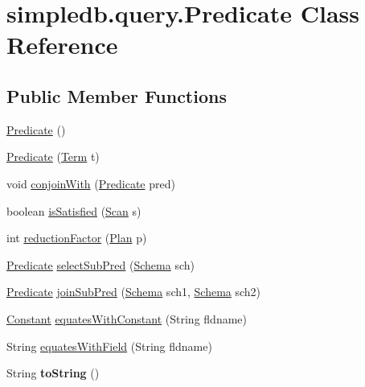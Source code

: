 \hypertarget{classsimpledb_1_1query_1_1Predicate}{}\section{simpledb.\+query.\+Predicate Class Reference}
\label{classsimpledb_1_1query_1_1Predicate}
\subsection*{Public Member Functions}
\begin{DoxyCompactItemize}
\item 
\hyperlink{classsimpledb_1_1query_1_1Predicate_aa52f71d773d6c8577f78868eecc30b5d}{Predicate} ()
\item 
\hyperlink{classsimpledb_1_1query_1_1Predicate_abf1bd6b991bdbf075da1926957458d04}{Predicate} (\hyperlink{classsimpledb_1_1query_1_1Term}{Term} t)
\item 
void \hyperlink{classsimpledb_1_1query_1_1Predicate_a986fd2943734aef4ed929e17d7d65e59}{conjoin\+With} (\hyperlink{classsimpledb_1_1query_1_1Predicate}{Predicate} pred)
\item 
boolean \hyperlink{classsimpledb_1_1query_1_1Predicate_a5dec40f471ec4552ef01fba7cf5d51cf}{is\+Satisfied} (\hyperlink{interfacesimpledb_1_1query_1_1Scan}{Scan} s)
\item 
int \hyperlink{classsimpledb_1_1query_1_1Predicate_a75d25b296d403755e0f49f13aabb290d}{reduction\+Factor} (\hyperlink{interfacesimpledb_1_1plan_1_1Plan}{Plan} p)
\item 
\hyperlink{classsimpledb_1_1query_1_1Predicate}{Predicate} \hyperlink{classsimpledb_1_1query_1_1Predicate_a4f8ab1bd25e5bdf45076190ebb290524}{select\+Sub\+Pred} (\hyperlink{classsimpledb_1_1record_1_1Schema}{Schema} sch)
\item 
\hyperlink{classsimpledb_1_1query_1_1Predicate}{Predicate} \hyperlink{classsimpledb_1_1query_1_1Predicate_a38645596a0d83c05ec9017984f6ffa86}{join\+Sub\+Pred} (\hyperlink{classsimpledb_1_1record_1_1Schema}{Schema} sch1, \hyperlink{classsimpledb_1_1record_1_1Schema}{Schema} sch2)
\item 
\hyperlink{classsimpledb_1_1query_1_1Constant}{Constant} \hyperlink{classsimpledb_1_1query_1_1Predicate_aeed39e1683b339b552f2855666c59e85}{equates\+With\+Constant} (String fldname)
\item 
String \hyperlink{classsimpledb_1_1query_1_1Predicate_a8d615e9ed4f49a5e6fe8ad0f245f5ba7}{equates\+With\+Field} (String fldname)
\item 
\mbox{\label{classsimpledb_1_1query_1_1Predicate_a046829d148b96e81947537fd46878642}} 
String {\bfseries to\+String} ()
\end{DoxyCompactItemize}


